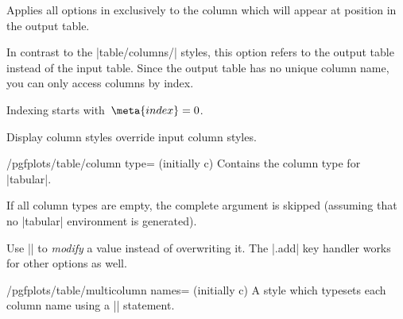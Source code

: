 \begin{pgfplotstabledisplaycolumnkey}
	Applies all options in  exclusively to the column which will appear at position  in the output table.

	In contrast to the |table/columns/| styles, this option refers to the output table instead of the input table. Since the output table has no unique column name, you can only access columns by index.

	Indexing starts with~$\meta{index}=0$.

	Display column styles override input column styles.
\end{pgfplotstabledisplaycolumnkey}

\begin{key}{/pgfplots/table/column type= (initially c)}
	Contains the column type for |tabular|. 
	
	If all column types are empty, the complete argument is skipped (assuming that no |tabular| environment is generated).

	Use || to \emph{modify} a value instead of overwriting it. The |.add| key handler works for other options as well.
\begin{codeexample}[width=7cm]
\end{codeexample}
\end{key}



\begin{stylekey}{/pgfplots/table/multicolumn names= (initially c)}
	A style which typesets each column name using a || statement.
\end{stylekey}

